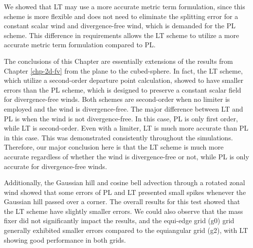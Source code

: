 We showed that LT may use a more accurate metric term formulation, since this scheme is more flexible and does not need to eliminate the splitting error for a constant
scalar wind and divergence-free wind, which is demanded for the PL scheme.
This difference in requirements allows the LT scheme to utilize a more accurate metric term formulation compared to PL.


The conclusions of this Chapter are essentially extensions of the results from Chapter \ref{chp-2d-fv} from the plane to the cubed-sphere.
In fact, the LT scheme, which utilize a second-order departure point calculation, showed to have smaller errors than the PL scheme,
which is designed to preserve a constant scalar field for divergence-free winds.
Both schemes are second-order when no limiter is employed and the wind is divergence-free.
The major difference between LT and PL is when the wind is not divergence-free.
In this case, PL is only first order, while LT is second-order. Even with a limiter, LT is much more accurate than PL in this case.
This was demonstrated consistently throughout the simulations.
Therefore, our major conclusion here is that the LT scheme is much more accurate regardless of whether the wind is divergence-free or not, while 
PL is only accurate for divergence-free winds.

Additionally, the Gaussian hill and cosine bell advection through a rotated zonal wind showed 
that some errors of PL and LT presented small spikes whenever the Gaussian hill passed over a corner.
The overall results for this test showed that the LT scheme have slightly smaller errors.
We could also observe that the mass fixer did not significantly impact the results,
and the equi-edge grid (g0) grid generally exhibited smaller errors compared to the equiangular grid (g2), with LT showing good performance in both grids.
